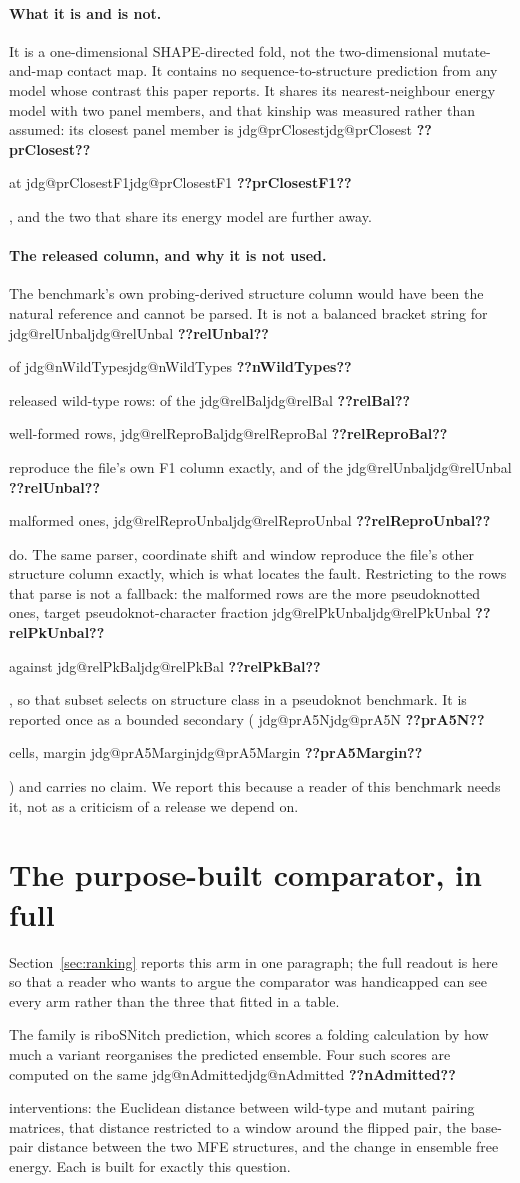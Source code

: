 \documentclass[11pt]{article}
\makeatletter
\newcommand{\jdg}[1]{%
  \ifcsname jdg@#1\endcsname\csname jdg@#1\endcsname
  \else\textbf{??#1??}\PackageError{nm}{undefined measured quantity #1}{}\fi}
\makeatother
\begin{document}
\paragraph{What it is and is not.} It is a one-dimensional SHAPE-directed fold, not the
two-dimensional mutate-and-map contact map. It contains no sequence-to-structure prediction from
any model whose contrast this paper reports. It shares its nearest-neighbour energy model with two
panel members, and that kinship was measured rather than assumed: its closest panel member is
\jdg{prClosest} at \jdg{prClosestF1}, and the two that share its energy model are further away.

\paragraph{The released column, and why it is not used.} The benchmark's own probing-derived
structure column would have been the natural reference and cannot be parsed. It is not a balanced
bracket string for \jdg{relUnbal} of \jdg{nWildTypes} released wild-type rows: of the
\jdg{relBal} well-formed rows, \jdg{relReproBal} reproduce the file's own F1 column exactly,
and of the \jdg{relUnbal} malformed ones, \jdg{relReproUnbal} do. The same parser, coordinate
shift and window reproduce the file's other structure column exactly, which is what locates the
fault. Restricting to the rows that parse is not a fallback: the malformed rows are the more
pseudoknotted ones, target pseudoknot-character fraction \jdg{relPkUnbal} against
\jdg{relPkBal}, so that subset selects on structure class in a pseudoknot benchmark. It is
reported once as a bounded secondary (\jdg{prA5N} cells, margin \jdg{prA5Margin}) and carries
no claim. We report this because a reader of this benchmark needs it, not as a criticism of a
release we depend on.

\FloatBarrier

\section{The purpose-built comparator, in full}
\label{app:ribosnitch}

Section~\ref{sec:ranking} reports this arm in one paragraph; the full readout is here so that a
reader who wants to argue the comparator was handicapped can see every arm rather than the three
that fitted in a table.

The family is riboSNitch prediction, which scores a folding calculation by how much a variant
reorganises the predicted ensemble. Four such scores are computed on the same \jdg{nAdmitted}
interventions: the Euclidean distance between wild-type and mutant pairing matrices, that distance
restricted to a window around the flipped pair, the base-pair distance between the two MFE
structures, and the change in ensemble free energy. Each is built for exactly this question.
\end{document}
